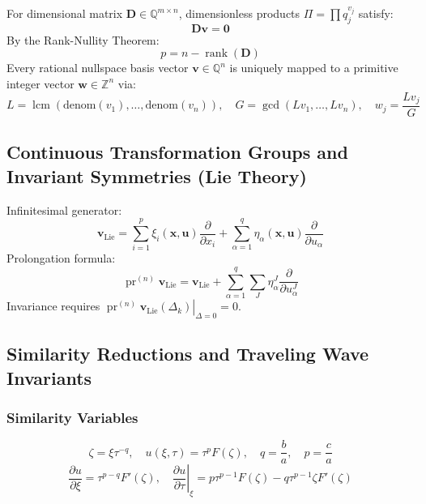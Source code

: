 \documentclass[11pt,a4paper]{article}
\begin{document}
For dimensional matrix $\mathbf{D} \in \mathbb{Q}^{m \times n}$, dimensionless products $\Pi = \prod q_j^{v_j}$ satisfy:
\begin{equation}
\mathbf{D} \mathbf{v} = \mathbf{0}
\end{equation}
By the Rank-Nullity Theorem:
\begin{equation}
p = n - \operatorname{rank}(\mathbf{D})
\end{equation}
Every rational nullspace basis vector $\mathbf{v} \in \mathbb{Q}^n$ is uniquely mapped to a primitive integer vector $\mathbf{w} \in \mathbb{Z}^n$ via:
\begin{equation}
L = \operatorname{lcm}(\text{denom}(v_1), \dots, \text{denom}(v_n)), \quad G = \operatorname{gcd}(L v_1, \dots, L v_n), \quad w_j = \frac{L v_j}{G}
\end{equation}

\subsection{Continuous Transformation Groups and Invariant Symmetries (Lie Theory)}

Infinitesimal generator:
\begin{equation}
\mathbf{v}_{\text{Lie}} = \sum_{i=1}^p \xi_i(\mathbf{x}, \mathbf{u}) \frac{\partial}{\partial x_i} + \sum_{\alpha=1}^q \eta_\alpha(\mathbf{x}, \mathbf{u}) \frac{\partial}{\partial u_\alpha}
\end{equation}
Prolongation formula:
\begin{equation}
\operatorname{pr}^{(n)} \mathbf{v}_{\text{Lie}} = \mathbf{v}_{\text{Lie}} + \sum_{\alpha=1}^q \sum_{J} \eta_\alpha^J \frac{\partial}{\partial u_\alpha^J}
\end{equation}
Invariance requires $\left. \operatorname{pr}^{(n)} \mathbf{v}_{\text{Lie}} (\Delta_k) \right|_{\Delta = 0} = 0$.

\subsection{Similarity Reductions and Traveling Wave Invariants}

\subsubsection{Similarity Variables}
\begin{equation}
\zeta = \xi \tau^{-q}, \quad u(\xi, \tau) = \tau^p F(\zeta), \quad q = \frac{b}{a}, \quad p = \frac{c}{a}
\end{equation}
\begin{equation}
\frac{\partial u}{\partial \xi} = \tau^{p-q} F'(\zeta), \quad \left. \frac{\partial u}{\partial \tau} \right|_{\xi} = p \tau^{p-1} F(\zeta) - q \tau^{p-1} \zeta F'(\zeta)
\end{equation}
\end{document}
